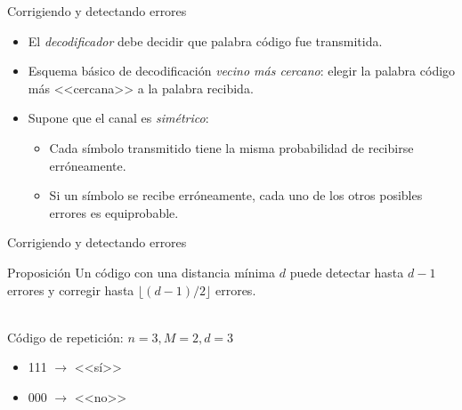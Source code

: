 \documentclass[aspectratio=43,14pt,spanish]{beamer}
\theoremstyle{definition} %
\begin{document}
    \begin{frame}{Corrigiendo y detectando errores}
        \begin{itemize}
            \item El \emph{decodificador} debe decidir que palabra código fue transmitida.
            \item Esquema básico de decodificación \emph{vecino más cercano}: elegir la palabra código más <<cercana>> a la palabra recibida.
            \item Supone que el canal es \emph{simétrico}: \begin{itemize}
                \item Cada símbolo transmitido tiene la misma probabilidad de recibirse erróneamente.
                \item Si un símbolo se recibe erróneamente, cada uno de los otros posibles errores es equiprobable.
            \end{itemize}
        \end{itemize}
    \end{frame}

    \begin{frame}{Corrigiendo y detectando errores}
        \begin{alertblock}{Proposición}
            Un código con una distancia mínima $d$ puede detectar hasta $d - 1$ errores y corregir hasta $\lfloor (d - 1)/2 \rfloor$ errores.
        \end{alertblock}

        \ \\

        Código de repetición: $n = 3, M = 2, d = 3$
        \begin{itemize}
            \item 111 $\rightarrow$ <<sí>>
            \item 000 $\rightarrow$ <<no>>
        \end{itemize}

    \end{frame}
\end{document}
